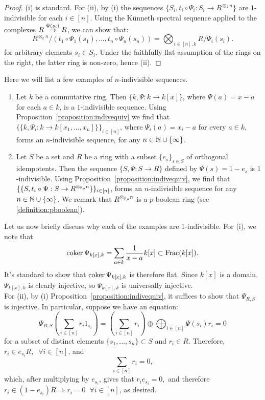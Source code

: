 \begin{proof}
(i) is standard. For (ii), by (i) the sequences $\{S_i, t_i \circ \Psi_i:S_i \to R^{\otimes_k n}\}$ are $1$-indivisible for each $i \in [n]$. 
Using the K\"unneth spectral sequence applied to the complexes $R \over{\Psi(s_i)}{\to} R$, we can show that:
\[R^{\otimes_{k} n}/(t_1 \circ \Psi_1({s_1}),...,t_n \circ \Psi_n(s_n)) = \bigotimes_{i\in [n], k} R/\Psi_i(s_i).\]
for arbitrary elements $s_i \in S_i$. Under the faithfully flat assumption of the rings on the right, the latter ring is non-zero, hence (ii).
\end{proof}
\begin{example}\label{example:indiv}
Here we will list a few examples of $n$-indivisible sequences.
\begin{enumerate}
\item[(i)] Let $k$ be a commutative ring. Then $\{k, \Psi:k \to k[x]\}$, where $\Psi(a) = x-a$ for each $a \in k$, 
is a $1$-indivisible sequence. Using Proposition~\ref{proposition:indivequiv} we find that 
$\{\{k, \Psi_i: k \to k[x_1,...,x_n]\}\}_{i\in [n]}$, where $\Psi_i(a) = x_i - a$ for every $a \in k$, forms an $n$-indivisible sequence, 
for any $n \in \bb{N} \cup \{\infty\}$. 
\item[(ii)] Let $S$ be a set and $R$ be a ring with a subset $\{e_s\}_{s \in S}$ of orthogonal idempotents. Then the sequence 
$\{S, \Psi:S \to R\}$ defined by $\Psi(s) = 1-e_s$ is $1$-indivisible. Using Proposition~\ref{proposition:indivequiv}, we find that 
$\{\{S, t_i \circ \Psi:S \to R^{\otimes_{\bb{F}_p} n}\}\}_{i \in [n]}$, forms an $n$-indivisible sequence for any 
$n \in \bb{N}\cup \{\infty\}$. We remark that $R^{\otimes_{\bb{F}_p} n}$ is a $p$-boolean ring (see \ref{definition:pboolean}).
\end{enumerate}
Let us now briefly discuss why each of the examples are $1$-indivisible. For (i), we note that
\[\coker{\Psi_{k[x],k}} = \sum_{a \in k} \frac{1}{x-a}k[x] \subset \text{Frac}(k[x]).\]
It's standard to show that $\coker{\Psi_{k[x],k}}$ is therefore flat. Since $k[x]$ is a domain, $\Psi_{k[x],k}$ is clearly injective, 
so $\Psi_{k[x],k}$ is universally injective.\\
\indent For (ii), by (i) Proposition~\ref{proposition:indivequiv}, it suffices to show that $\Psi_{R,S}$ is injective. 
In particular, suppose we have an equation:
\[\Psi_{R,S}(\sum_{i \in [n]} r_i 1_{s_i}) = (\sum_{i \in [n]} r_i) \oplus \bigoplus_{i \in [n]} \Psi(s_i)r_i = 0\]
for a subset of distinct elements $\{s_1,...,s_n\} \subset S$ and $r_i \in R$. Therefore, $r_i \in e_{s_i}R, \; \; \forall i \in [n]$, 
and 
\[\sum_{i \in [n]} r_i = 0,\]
which, after multiplying by $e_{s_i}$, gives that $r_ie_{s_i}=0,$ and therefore $r_i \in (1-e_{s_i})R \Rightarrow r_i=0 \;\; \forall i \in [n]$, as desired. 
\end{example}
